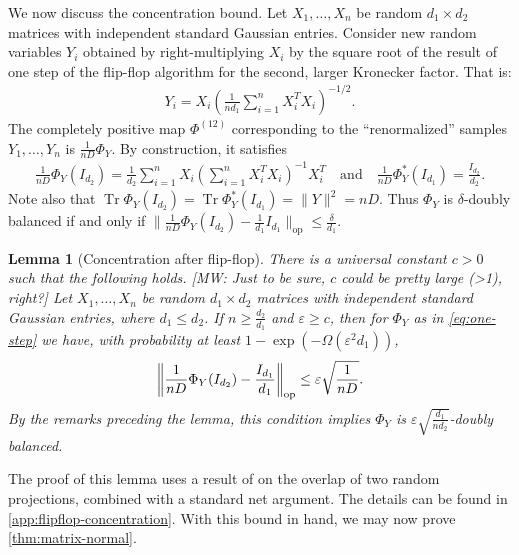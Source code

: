 \documentclass[aos]{imsart}
\newtheorem{lemma}[theorem]{Lemma}
\theoremstyle{definition}
\numberwithin{equation}{section}
\DeclareMathOperator{\op}{op}
\DeclareMathOperator{\tr}{Tr}
\DeclarePairedDelimiter{\norm}{\lVert}{\rVert}
\newcommand{\eps}{\varepsilon}
\newcommand{\MW}[1]{{\color{red}[MW: #1]}}
\newcommand{\MW}[1]{{}}
\begin{document}
We now discuss the concentration bound.
Let $X_1,\dots,X_n$ be random $d_1 \times d_2$ matrices with independent standard Gaussian entries.
Consider new random variables $Y_i$ obtained by right-multiplying $X_i$ by the square root of the result of one step of the flip-flop algorithm for the second, larger Kronecker factor.
That is:
\begin{align}\label{eq:one-step}
  Y_i = X_i \left( \frac1{nd_1} \sum_{i=1}^n X_i^T X_i \right)^{-1/2}.
\end{align}
The completely positive map $\Phi^{(12)}$ corresponding to the ``renormalized'' samples $Y_1,\dots,Y_n$ is $\frac1{nD} \Phi_Y$.
By construction, it satisfies
\begin{align*}
  \frac1{n D} \Phi_Y(I_{d_2}) = \frac1{d_2} \sum_{i=1}^{n} X_i \left( \sum_{i=1}^n X_i^T X_i \right)^{-1} X_i^T
\quad\text{and}\quad
  \frac1{n D} \Phi^*_Y(I_{d_1}) = \frac{I_{d_2}}{d_2}.
\end{align*}
Note also that $\tr \Phi_Y(I_{d_2}) = \tr \Phi_Y^*(I_{d_1}) = \|Y\|^2 = nD$. Thus $\Phi_Y$ is $\delta$-doubly balanced if and only if $\|\frac{1}{nD} \Phi_Y(I_{d_2}) - \frac{1}{d_1} I_{d_1}\|_{\op} \leq \frac{\delta}{d_1}$.

\begin{lemma}[Concentration after flip-flop]\label{lem:flipflop-concentration}
There is a universal constant $c>0$ such that the following holds.
\MW{Just to be sure, $c$ could be pretty large (>1), right?}
Let $X_1,\dots,X_n$ be random $d_1 \times d_2$ matrices with independent standard Gaussian entries, where $d_1 \leq d_2$.
If $n \geq \frac{d_2}{d_1}$ and $\eps\geq c$, then for $\Phi_Y$ as in \cref{eq:one-step} we have, with probability at least $1 - \exp(- \Omega( \eps^2 d_{1}))$,
\begin{align*}
  \norm*{\frac1{n D} \Phi_Y(I_{d_2}) - \frac{I_{d_1}}{d_1}}_{\op} \leq \eps \sqrt{\frac1{nD}}.
\end{align*}
By the remarks preceding the lemma, this condition implies $\Phi_Y$ is $\eps \sqrt{\frac{d_1}{nd_2}}$-doubly balanced.
\end{lemma}

The proof of this lemma uses a result of \cite{hayden2006aspects} on the overlap of two random projections, combined with a standard net argument.
The details can be found in \cref{app:flipflop-concentration}.
With this bound in hand, we may now prove \cref{thm:matrix-normal}.
\end{document}
